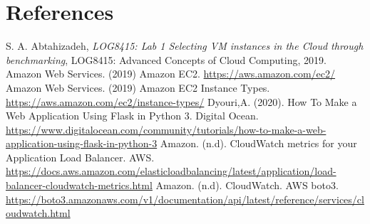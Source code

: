 \documentclass[12pt]{article}
\begin{document}
\section{References} \label{sec:references}
	
	\begin{thebibliography} {}
		 S. A. Abtahizadeh, \emph{LOG8415: Lab 1 Selecting VM instances in the Cloud through benchmarking}, LOG8415: Advanced Concepts of Cloud Computing, 2019.
		 Amazon Web Services. (2019) Amazon EC2. \url{https://aws.amazon.com/ec2/}
		 Amazon Web Services. (2019) Amazon EC2 Instance Types. \url{https://aws.amazon.com/ec2/instance-types/}
		 Dyouri,A. (2020). How To Make a Web Application Using Flask in Python 3. Digital Ocean.  \url{https://www.digitalocean.com/community/tutorials/how-to-make-a-web-application-using-flask-in-python-3}
		 Amazon. (n.d). CloudWatch metrics for your Application Load Balancer. AWS. \url{https://docs.aws.amazon.com/elasticloadbalancing/latest/application/load-balancer-cloudwatch-metrics.html}
		 Amazon. (n.d). CloudWatch. AWS boto3. \url{https://boto3.amazonaws.com/v1/documentation/api/latest/reference/services/cloudwatch.html}
	\end{thebibliography}
\end{document}
